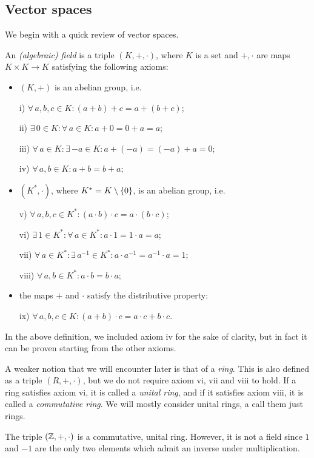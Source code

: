 \subsection{Vector spaces}

We begin with a quick review of vector spaces.

\bd
An \emph{(algebraic) field} is a triple $(K,+,\cdot)$, where $K$ is a set and $+,\cdot$ are maps $K\times K \to K$ satisfying the following axioms:
\begin{itemize}
\item $(K,+)$ is an abelian group, i.e.
\ben
\item[i)] $\forall \, a,b,c \in K : (a+b)+c=a+(b+c)$;
\item[ii)] $\exists \, 0 \in K : \forall \, a \in K : a+0=0+a=a$;
\item[iii)] $\forall \, a \in K : \exists \, {-a} \in K : a+(-a)=(-a)+a=0$;
\item[iv)] $\forall \, a,b \in K : a+b=b+a$;
\een
\item $(K^*,\cdot)$, where $K^*=K\setminus\{0\}$, is an abelian group, i.e.
\ben
\item[v)] $\forall \, a,b,c \in K^* : (a\cdot b)\cdot c=a\cdot (b\cdot c)$;
\item[vi)] $\exists \, 1 \in K^* : \forall \, a \in K^* : a\cdot 1=1\cdot a=a$;
\item[vii)] $\forall \, a \in K^* : \exists \, a^{-1} \in K^* : a\cdot a^{-1}=a^{-1} \cdot a=1$;
\item[viii)] $\forall \, a,b \in K^* : a\cdot b=b\cdot a$;
\een
\item the maps $+$ and $\cdot$ satisfy the distributive property:
\ben
\item[ix)] $\forall \, a,b,c \in K : (a+ b)\cdot c=a\cdot c + b\cdot c$.
\een
\end{itemize}
\ed

\br
In the above definition, we included axiom iv for the sake of clarity, but in fact it can be proven starting from the other axioms.
\er

\br
A weaker notion that we will encounter later is that of a \emph{ring}. This is also defined as a triple $(R,+,\cdot)$, but we do not require axiom vi, vii and viii to hold. If a ring satisfies axiom vi, it is called a \emph{unital ring}, and if it satisfies axiom viii, it is called a \emph{commutative ring}. We will mostly consider unital rings, a call them just rings.
\er

\be
The triple $(\mathbb{Z},+,\cdot)$ is a commutative, unital ring. However, it is not a field since $1$ and $-1$ are the only two elements which admit an inverse under multiplication.
\ee

